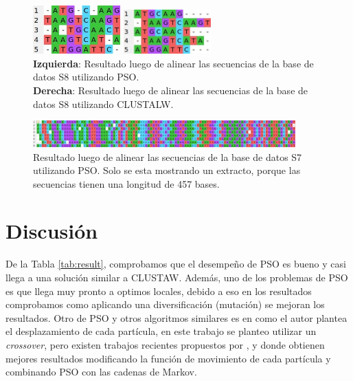 \documentclass{cup-pan}
\begin{document}
	
	\begin{figure}[h]
		\centering
		\begin{multicols}{2}
			\includegraphics[width=0.3\textwidth]{images/s8_align}\par 
			\includegraphics[width=0.3\textwidth]{images/s8_align_mega}\par 
		\end{multicols}
		\caption{\textbf{Izquierda}: Resultado luego de alinear las secuencias de la base de datos S8 utilizando PSO.\\  \textbf{Derecha}: Resultado luego de alinear las secuencias de la base de datos S8 utilizando CLUSTALW.}
		\label{fig:s8_align}
	\end{figure}

\begin{figure}[h]
	\centering
	\includegraphics[width=0.9\textwidth]{images/s7_align}
	\caption{Resultado luego de alinear las secuencias de la base de datos S7 utilizando PSO. Solo se esta mostrando un extracto, porque las secuencias tienen una longitud de 457 bases.}
	\label{fig:s7_align}
\end{figure}
	
	
	\section{Discusión}
	
	De la Tabla \ref{tab:result}, comprobamos que el desempeño de PSO es bueno y casi llega a una solución similar a CLUSTAW. Además, uno de los problemas de PSO es que llega muy pronto a optimos locales, debido a eso en los resultados comprobamos como aplicando una diversificación (mutación) se mejoran los resultados. Otro de PSO y otros algoritmos similares es en como el autor plantea el desplazamiento de cada partícula, en este trabajo se planteo utilizar un \textit{crossover}, pero existen trabajos recientes propuestos por \citet{zhan2019probpfp}, \citet{lalwani2019multi} y \citet{moustafa2017fragmented} donde obtienen mejores resultados modificando la función de movimiento de cada partícula y combinando PSO con las cadenas de Markov. \\
	
\end{document}
